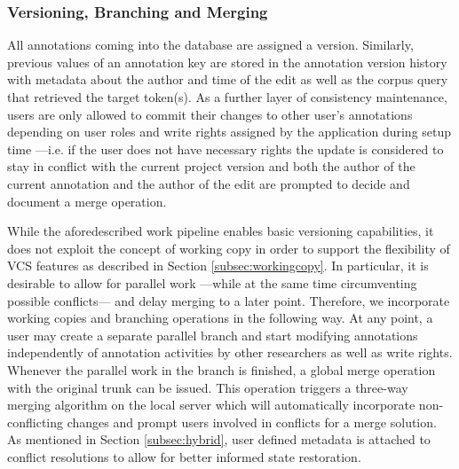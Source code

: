 \documentclass{sig-alternate}
\begin{document}

\subsubsection{Versioning, Branching and Merging}\label{subsec:dbversion}

All annotations coming into the database are assigned a version. Similarly, previous values
of an annotation key are stored in the annotation version history with metadata about the author
and time of the edit as well as the corpus query that retrieved the target token(s).
As a further layer of consistency maintenance, users are only allowed to commit their changes
to other user's annotations depending on user roles and write rights assigned by the application
during setup time ---i.e. if the user does not have necessary rights the update is
considered to stay in conflict with the current project version and both the author of the
current annotation and the author of the edit are prompted to decide and document a merge operation.

While the aforedescribed work pipeline enables basic versioning capabilities, it does not exploit
the concept of working copy in order to support the flexibility of VCS features as described in
Section \ref{subsec:workingcopy}. In particular, it is desirable to allow for parallel
work ---while at the same time circumventing possible conflicts--- and delay merging to a later
point. 
Therefore, we incorporate working copies and branching operations in the following way.
At any point, a user may create a separate parallel branch and start modifying annotations
independently of annotation activities by other researchers as well as write rights. Whenever the
parallel work in the branch is finished, a global merge operation with the original trunk can be
issued.
This operation triggers a three-way merging algorithm on the local server which will
automatically incorporate non-conflicting changes and prompt users involved in conflicts for
a merge solution. As mentioned in Section \ref{subsec:hybrid}, user defined metadata is attached
to conflict resolutions to allow for better informed state restoration.
\end{document}
